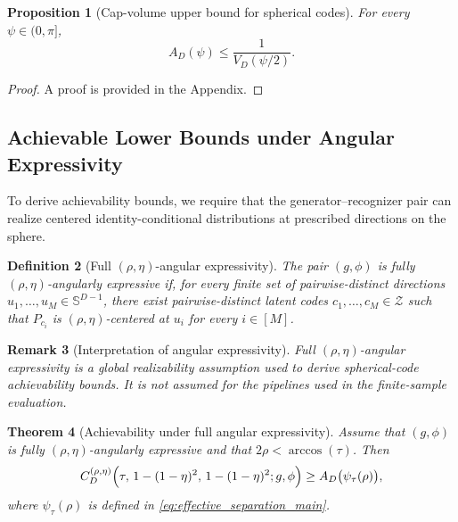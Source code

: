 \documentclass[journal]{IEEEtran}
\newtheorem{theorem}{Theorem}
\newtheorem{definition}[theorem]{Definition}
\newtheorem{remark}[theorem]{Remark}
\newtheorem{proposition}[theorem]{Proposition}
\begin{document}
\begin{bibunit}
\begin{proposition}[Cap-volume upper bound for spherical codes]
\label{prop:cap_volume_converse_main}
%
For every $\psi\in(0,\pi]$,
\begin{equation}
A_D(\psi)\le \frac{1}{V_D(\psi/2)}.
\label{eq:cap_volume_upper_main}
\end{equation}
%
\end{proposition}

\begin{proof}
A proof is provided in the Appendix.
\end{proof}




\subsection{Achievable Lower Bounds under Angular Expressivity}
\label{subsec:angular_expressivity}

To derive achievability bounds, we require that the generator--recognizer pair can realize centered identity-conditional distributions at prescribed directions on the sphere.

\begin{definition}[Full $(\rho,\eta)$-angular expressivity]
\label{def:full_angular_expressivity_main}
%
The pair $(g,\phi)$ is \textit{fully $(\rho,\eta)$-angularly expressive} if, for every finite set of pairwise-distinct directions $u_1,\ldots,u_M\in\mathbb S^{D-1}$, there exist pairwise-distinct latent codes $c_1,\ldots,c_M\in\mathcal Z$ such that $P_{c_i}$ is $(\rho,\eta)$-centered at $u_i$ for every $i\in[M]$.
%
\end{definition}

\begin{remark}[Interpretation of angular expressivity]
%
Full $(\rho,\eta)$-angular expressivity is a global realizability assumption used to derive spherical-code achievability bounds. It is not assumed for the pipelines used in the finite-sample evaluation.
%
\end{remark}


\begin{theorem}[Achievability under full angular expressivity]
\label{thm:achievability_main}
%
Assume that $(g,\phi)$ is fully $(\rho,\eta)$-angularly expressive and that $2\rho<\arccos(\tau)$. Then
%
\begin{equation}
C_D^{(\rho,\eta)} \Bigl( \tau,\, 1-(1-\eta)^2,\, 1-(1-\eta)^2; g,\phi \Bigr)
\ge A_D\bigl(\psi_\tau(\rho)\bigr),
\label{eq:achievability_main}
\end{equation}
%
where $\psi_\tau(\rho)$ is defined in \eqref{eq:effective_separation_main}.
%
\end{theorem}


\end{bibunit}
\end{document}
